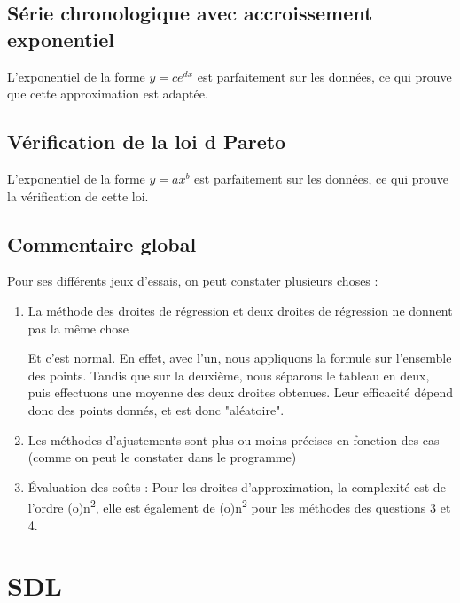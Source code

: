 \documentclass[letter]{article}
\begin{document}
\subsection{Série chronologique avec accroissement exponentiel}
\label{sec:org4837a61}

L'exponentiel de la forme \(y = ce^{dx}\) est parfaitement sur les données, ce qui prouve que cette approximation est adaptée.

\subsection{Vérification de la loi d Pareto}
\label{sec:org8d16b62}

L'exponentiel de la forme \(y = ax^b\) est parfaitement sur les données, ce qui prouve la vérification de cette loi.

\subsection{Commentaire global}
\label{sec:org7be5a46}

Pour ses différents jeux d'essais, on peut constater plusieurs choses :

\begin{enumerate}
\item La méthode des droites de régression et deux droites de régression ne donnent pas la même chose

Et c'est normal. En effet, avec l'un, nous appliquons la formule sur l'ensemble des points. Tandis que sur la deuxième, nous séparons le tableau en deux, puis effectuons une moyenne des deux droites obtenues. Leur efficacité dépend donc des points donnés, et est donc "aléatoire".

\item Les méthodes d'ajustements sont plus ou moins précises en fonction des cas (comme on peut le constater dans le programme)

\item Évaluation des coûts :
Pour les droites d'approximation, la complexité est de l'ordre (o)n\textsuperscript{2}, elle est également de (o)n\textsuperscript{2} pour les méthodes des questions 3 et 4.
\end{enumerate}


\section{SDL}
\label{sec:org0995792}
\end{document}
